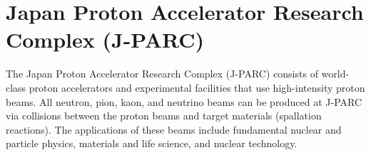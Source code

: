 \begin{comment}
In the $\SM$ production, SAC in front of the KURAMA magnet vetoed outgoing $\pP$s with a rejection efficiency $\sim99\%$ under the data-taking rate of 300 kHz \cite{Koba-2016}. Therefore, 1\% of $\pP$ data SAC accepted were accumulated simultaneously. The byproduct data include the $\PiKL$ reaction when $\pP$ from the $\kzdecay$ decay passed through the KURAMA magnet. This paper analyzed the $\PiKL$ reaction data to search for Lp scattering events and measure beam L polarization as a feasibility study of the next-generation $\Lp$ scattering experiment, J-PARC E86. Our analysis assumed that the $\PiKL$ reaction produced the beam $\Lambda$ for the $\Lp$ scattering. 

The analysis method assuming the detector configuration of the present experiment to identify the $\PiKL$ reaction has been established for the first time. We developed a new $\Kz$ identification method where the KURAMA spectrometer and the CATCH system detect $\pP$ and $\pM$ from the $\kzdecay$ decay, respectively. This is due to the limited spectrometer acceptance of the KURAMA spectrometer. To compensate for the missing information of $\pM$ energy, we introduced \say{$\Kz$ assumption} for the detected $\pP$ and $\pM$. This method assumes that the two $\pi$s originate from the $\kzdecay$ decay and determines the momentum of $\pM$ so that the invariant mass between $\pP$ and $\pM$ is equal to the mass of $\Kz$. Then, the missing mass of the $\PiKX$ reaction was calculated. If the $\Lambda$ production events occur, the missing mass peak corresponding to the mass of $\Lambda$ appears: the $\Kz$ assumption is valid for such events. Conversely, spurious events, \say{non-$\Kz$ events}, in which $\Kz$ was not produced formed huge background structures in the missing mass spectrum. From this $\PiKL$ reaction analysis explained above $\sim379$ k $\Lambda$ in a momentum range of $0.25-1.25$ GeV/$c$ were identified. Using these momentum-tagged beam $\Lambda$s, the $\Lp$ scattering event search and beam $\Lambda$ polarization measurement were performed. 

\end{comment}


\section{Japan Proton Accelerator Research Complex (J-PARC)}
\label{sec-jparc}

The Japan Proton Accelerator Research Complex (J-PARC) consists of world-class proton accelerators and experimental facilities that use high-intensity proton beams. All neutron, pion, kaon, and neutrino beams can be produced at J-PARC via collisions between the proton beams and target materials (spallation reactions). The applications of these beams include fundamental nuclear and particle physics, materials and life science, and nuclear technology.

